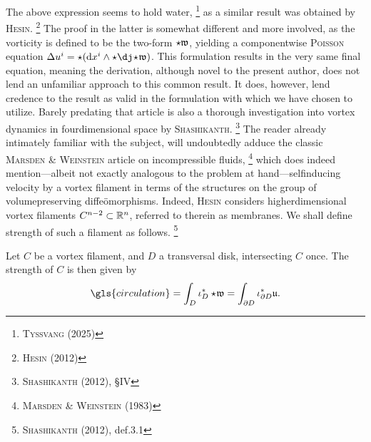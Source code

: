 \noindent
The above expression seems to hold water,%
\footnote{%
        \cite{tyssvang2025derivation} \textsc{Tyssvang} (2025)
}
as a similar result was obtained by \textsc{Hesin}.%
\footnote{%
        \cite{hesin2012symplectic} \textsc{Hesin} (2012)
}
The proof in the latter is somewhat different and more involved, as the vorticity is defined to be the two-form $\star\mathfrak{w}$, yielding a componentwise \textsc{Poisson} equation $\Delta u^i = \star(\dee x^{i} \wedge \star \codee \!\star\! \vorticityfrak)$.
This formulation results in the very same final equation, meaning the derivation, although novel to the present author, does not lend an unfamiliar approach to this common result.
It does, however, lend credence to the result as valid in the formulation with which we have chosen to utilize.
Barely predating that article is also a thorough investigation into vortex dynamics in fourdimensional space by \textsc{Shashikanth}.%
\footnote{%
        \cite{shashikanth2012vortex} \textsc{Shashikanth} (2012), \S{IV}
}
The reader already intimately familiar with the subject, will undoubtedly adduce the classic \textsc{Marsden} \& \textsc{Weinstein} article on incompressible fluids,%
\footnote{%
        \cite{marsden1983coadjoint} \textsc{Marsden} \& \textsc{Weinstein} (1983)
}
which does indeed mention---albeit not exactly analogous to the problem at hand---selfinducing velocity by a vortex filament in terms of the structures on the group of volumepreserving diffeömorphisms.
Indeed, \textsc{Hesin} considers higherdimensional vortex filaments $C^{n-2} \subset \mathbb{R}^n$, referred to therein as membranes.
We shall define strength of such a filament as follows.%
\footnote{%
        \cite{shashikanth2012vortex} \textsc{Shashikanth} (2012), def.3.1
}

\begin{definition}[Circulation]\label{def:circulation}
  Let $C$ be a vortex filament, and $D$ a transversal disk, intersecting $C$ once.
  The strength of $C$ is then given by
  \[
    \gls{circulation} = \int_{D} \iota_{D}^{\ast} \star\!\vorticityfrak = \int_{\partial D} \iota_{\partial D}^{\ast} \ufrak.
  \]
\end{definition}

